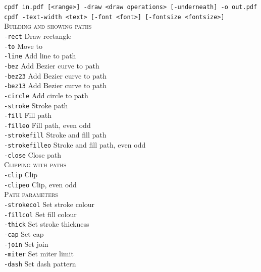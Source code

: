 \documentclass{book}
\begin{document}
  {\small\begin{framed}

   \noindent\verb!cpdf in.pdf [<range>] -draw <draw operations> [-underneath] -o out.pdf!\\
   \noindent\verb!cpdf -text-width <text> [-font <font>] [-fontsize <fontsize>]!\\

   \vspace{1.5mm}
   \noindent \textsc{Building and showing paths}\\
   \noindent\verb!-rect! Draw rectangle\\
   \noindent\verb!-to! Move to\\
   \noindent\verb!-line! Add line to path\\
   \noindent\verb!-bez! Add Bezier curve to path\\
   \noindent\verb!-bez23! Add Bezier curve to path\\
   \noindent\verb!-bez13! Add Bezier curve to path\\
   \noindent\verb!-circle! Add circle to path\\
   \noindent\verb!-stroke! Stroke path\\
   \noindent\verb!-fill! Fill path\\
   \noindent\verb!-filleo! Fill path, even odd\\
   \noindent\verb!-strokefill! Stroke and fill path\\
   \noindent\verb!-strokefilleo! Stroke and fill path, even odd\\
   \noindent\verb!-close! Close path\\

   \vspace{1.5mm}
   \noindent \textsc{Clipping with paths}\\
   \noindent\verb!-clip! Clip\\
   \noindent\verb!-clipeo! Clip, even odd\\

   \vspace{1.5mm}
   \noindent \textsc{Path parameters}\\
   \noindent\verb!-strokecol! Set stroke colour\\
   \noindent\verb!-fillcol! Set fill colour\\
   \noindent\verb!-thick! Set stroke thickness\\
   \noindent\verb!-cap! Set cap\\
   \noindent\verb!-join! Set join\\
   \noindent\verb!-miter! Set miter limit\\
   \noindent\verb!-dash! Set dash pattern\\


\end{framed}}
\end{document}
